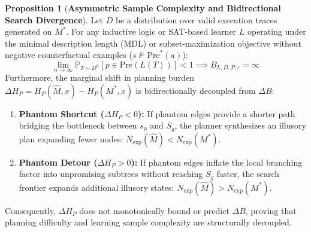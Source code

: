 \documentclass[11pt,a4paper]{article}
\theoremstyle{definition}
\newtheorem{proposition}{Proposition}
\begin{document}
\begin{proposition}[\textbf{Asymmetric Sample Complexity and Bidirectional Search Divergence}]
Let $D$ be a distribution over valid execution traces generated on $M^*$. For any inductive logic or SAT-based learner $L$ operating under the minimal description length (MDL) or subset-maximization objective without negative counterfactual examples ($s \not\models \text{Pre}^*(a)$):
\begin{equation}
\lim_{n \to \infty} \mathbb{P}_{T \sim D^n}\left[ p \in \text{Pre}(L(T)) \right] < 1 \implies B_{L, D, P, \varepsilon} = \infty
\end{equation}
Furthermore, the marginal shift in planning burden $\Delta H_P = H_P(\widehat{M}, x) - H_P(M^*, x)$ is bidirectionally decoupled from $\Delta B$:
\begin{enumerate}
    \item \textbf{Phantom Shortcut ($\Delta H_P < 0$):} If phantom edges provide a shorter path bridging the bottleneck between $s_0$ and $S_g$, the planner synthesizes an illusory plan expanding fewer nodes: $N_{\text{exp}}(\widehat{M}) < N_{\text{exp}}(M^*)$.
    \item \textbf{Phantom Detour ($\Delta H_P > 0$):} If phantom edges inflate the local branching factor into unpromising subtrees without reaching $S_g$ faster, the search frontier expands additional illusory states: $N_{\text{exp}}(\widehat{M}) > N_{\text{exp}}(M^*)$.
\end{enumerate}
Consequently, $\Delta H_P$ does not monotonically bound or predict $\Delta B$, proving that planning difficulty and learning sample complexity are structurally decoupled.
\end{proposition}
\end{document}
